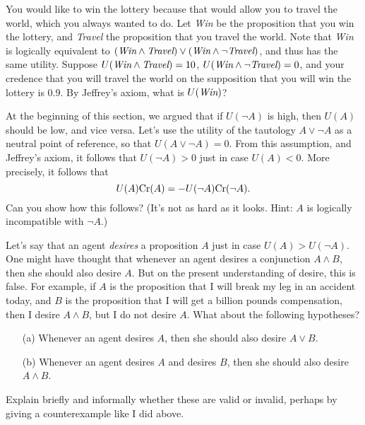 \begin{exercise}
  You would like to win the lottery because that would allow you to
  travel the world, which you always wanted to do. Let \emph{Win} be
  the proposition that you win the lottery, and \emph{Travel} the
  proposition that you travel the world. Note that \emph{Win} is
  logically equivalent to $(\emph{Win} \land \emph{Travel}) \lor
  (\emph{Win} \land \neg \emph{Travel})$, and thus has the same
  utility. Suppose $U(\emph{Win} \land \emph{Travel}) = 10$,
  $U(\emph{Win} \land \neg \emph{Travel}) = 0$, and your credence that
  you will travel the world on the supposition that you will win the
  lottery is 0.9. By Jeffrey's axiom, what is $U(\emph{Win})$?
\end{exercise}

\begin{exercise}
  At the beginning of this section, we argued that if $U(\neg A)$ is
  high, then $U(A)$ should be low, and vice versa. Let's use the
  utility of the tautology $A \lor \neg A$ as a neutral point of
  reference, so that $U(A \lor \neg A) = 0$. From this assumption, and
  Jeffrey's axiom, it follows that $U(\neg A) > 0$ just in case $U(A)
  < 0$. More precisely, it follows that
  \[
  U(A)\text{Cr}(A) = - U(\neg A)\text{Cr}(\neg A).
  \]
  Can you show how this follows? (It's not as hard as it looks. Hint:
  $A$ is logically incompatible with $\neg A$.)
\end{exercise}

\begin{exercise}
  Let's say that an agent \emph{desires} a proposition $A$ just in
  case $U(A) > U(\neg A)$. One might have thought that whenever an
  agent desires a conjunction $A \land B$, then she should also desire
  $A$. But on the present understanding of desire, this is false. For
  example, if $A$ is the proposition that I will break my leg in an
  accident today, and $B$ is the proposition that I will get a billion
  pounds compensation, then I desire $A \land B$, but I do not desire
  $A$. What about the following hypotheses?
  \begin{enumerate}
  \item[(a)] Whenever an agent desires $A$, then she should also desire $A
    \lor B$.
  \item[(b)] Whenever an agent desires $A$ and desires $B$, then she
    should also desire $A \land B$.
  \end{enumerate}
  Explain briefly and informally whether these are valid or invalid,
  perhaps by giving a counterexample like I did above.
  

\end{exercise}

